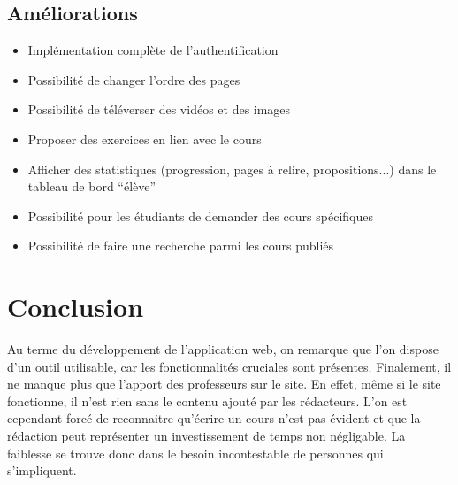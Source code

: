 \documentclass[a4paper,10pt,twoside]{sphinxmanual}
\begin{document}
\section{Améliorations}
\label{bugs:ameliorations}\begin{itemize}
\item {} 
Implémentation complète de l'authentification

\item {} 
Possibilité de changer l'ordre des pages

\item {} 
Possibilité de téléverser des vidéos et des images

\item {} 
Proposer des exercices en lien avec le cours

\item {} 
Afficher des statistiques (progression, pages à relire, propositions...) dans le tableau de bord ``élève''

\item {} 
Possibilité pour les étudiants de demander des cours spécifiques

\item {} 
Possibilité de faire une recherche parmi les cours publiés

\end{itemize}


\chapter{Conclusion}
\label{conclusion::doc}\label{conclusion:conclusion}
Au terme du développement de l'application web, on remarque que l'on dispose d'un outil utilisable, car les fonctionnalités cruciales sont présentes. Finalement, il ne manque plus que l'apport des professeurs sur le site. En effet, même si le site fonctionne, il n'est rien sans le contenu ajouté par les rédacteurs. L'on est cependant forcé de reconnaitre qu'écrire un cours n'est pas évident et que la rédaction peut représenter un investissement de temps non négligable. La faiblesse se trouve donc dans le besoin incontestable de personnes qui s'impliquent.
\end{document}

